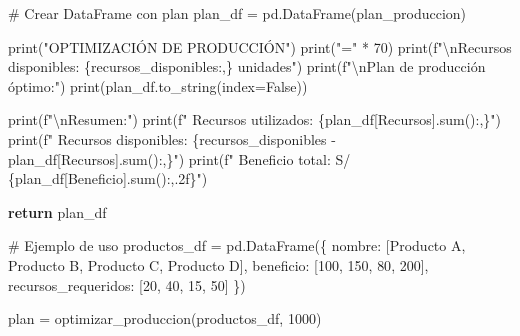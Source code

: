 \documentclass[
  doc,
  floatsintext,
  longtable,
  a4paper,
  nolmodern,
  notxfonts,
  notimes,
  12pt,
  colorlinks=true,linkcolor=blue,citecolor=blue,urlcolor=blue]{apa7}
\newenvironment{Shaded}{\begin{snugshade}}{\end{snugshade}}
\newcommand{\BuiltInTok}[1]{\textcolor[rgb]{0.00,0.23,0.31}{#1}}
\newcommand{\CharTok}[1]{\textcolor[rgb]{0.13,0.47,0.30}{#1}}
\newcommand{\CommentTok}[1]{\textcolor[rgb]{0.37,0.37,0.37}{#1}}
\newcommand{\ControlFlowTok}[1]{\textcolor[rgb]{0.00,0.23,0.31}{\textbf{#1}}}
\newcommand{\DecValTok}[1]{\textcolor[rgb]{0.68,0.00,0.00}{#1}}
\newcommand{\NormalTok}[1]{\textcolor[rgb]{0.00,0.23,0.31}{#1}}
\newcommand{\OperatorTok}[1]{\textcolor[rgb]{0.37,0.37,0.37}{#1}}
\newcommand{\SpecialCharTok}[1]{\textcolor[rgb]{0.37,0.37,0.37}{#1}}
\newcommand{\SpecialStringTok}[1]{\textcolor[rgb]{0.13,0.47,0.30}{#1}}
\newcommand{\StringTok}[1]{\textcolor[rgb]{0.13,0.47,0.30}{#1}}
\newcommand{\VariableTok}[1]{\textcolor[rgb]{0.07,0.07,0.07}{#1}}
\begin{document}
\begin{Shaded}
\begin{Highlighting}[]
    \CommentTok{\# Crear DataFrame con plan}
\NormalTok{    plan\_df }\OperatorTok{=}\NormalTok{ pd.DataFrame(plan\_produccion)}
    
    \BuiltInTok{print}\NormalTok{(}\StringTok{"OPTIMIZACIÓN DE PRODUCCIÓN"}\NormalTok{)}
    \BuiltInTok{print}\NormalTok{(}\StringTok{"="} \OperatorTok{*} \DecValTok{70}\NormalTok{)}
    \BuiltInTok{print}\NormalTok{(}\SpecialStringTok{f"}\CharTok{\textbackslash{}n}\SpecialStringTok{Recursos disponibles: }\SpecialCharTok{\{}\NormalTok{recursos\_disponibles}\SpecialCharTok{:,\}}\SpecialStringTok{ unidades"}\NormalTok{)}
    \BuiltInTok{print}\NormalTok{(}\SpecialStringTok{f"}\CharTok{\textbackslash{}n}\SpecialStringTok{Plan de producción óptimo:"}\NormalTok{)}
    \BuiltInTok{print}\NormalTok{(plan\_df.to\_string(index}\OperatorTok{=}\VariableTok{False}\NormalTok{))}
    
    \BuiltInTok{print}\NormalTok{(}\SpecialStringTok{f"}\CharTok{\textbackslash{}n}\SpecialStringTok{Resumen:"}\NormalTok{)}
    \BuiltInTok{print}\NormalTok{(}\SpecialStringTok{f"  Recursos utilizados: }\SpecialCharTok{\{}\NormalTok{plan\_df[}\StringTok{\textquotesingle{}Recursos\textquotesingle{}}\NormalTok{]}\SpecialCharTok{.}\BuiltInTok{sum}\NormalTok{()}\SpecialCharTok{:,\}}\SpecialStringTok{"}\NormalTok{)}
    \BuiltInTok{print}\NormalTok{(}\SpecialStringTok{f"  Recursos disponibles: }\SpecialCharTok{\{}\NormalTok{recursos\_disponibles }\OperatorTok{{-}}\NormalTok{ plan\_df[}\StringTok{\textquotesingle{}Recursos\textquotesingle{}}\NormalTok{]}\SpecialCharTok{.}\BuiltInTok{sum}\NormalTok{()}\SpecialCharTok{:,\}}\SpecialStringTok{"}\NormalTok{)}
    \BuiltInTok{print}\NormalTok{(}\SpecialStringTok{f"  Beneficio total: S/ }\SpecialCharTok{\{}\NormalTok{plan\_df[}\StringTok{\textquotesingle{}Beneficio\textquotesingle{}}\NormalTok{]}\SpecialCharTok{.}\BuiltInTok{sum}\NormalTok{()}\SpecialCharTok{:,.2f\}}\SpecialStringTok{"}\NormalTok{)}
    
    \ControlFlowTok{return}\NormalTok{ plan\_df}

\CommentTok{\# Ejemplo de uso}
\NormalTok{productos\_df }\OperatorTok{=}\NormalTok{ pd.DataFrame(\{}
    \StringTok{\textquotesingle{}nombre\textquotesingle{}}\NormalTok{: [}\StringTok{\textquotesingle{}Producto A\textquotesingle{}}\NormalTok{, }\StringTok{\textquotesingle{}Producto B\textquotesingle{}}\NormalTok{, }\StringTok{\textquotesingle{}Producto C\textquotesingle{}}\NormalTok{, }\StringTok{\textquotesingle{}Producto D\textquotesingle{}}\NormalTok{],}
    \StringTok{\textquotesingle{}beneficio\textquotesingle{}}\NormalTok{: [}\DecValTok{100}\NormalTok{, }\DecValTok{150}\NormalTok{, }\DecValTok{80}\NormalTok{, }\DecValTok{200}\NormalTok{],}
    \StringTok{\textquotesingle{}recursos\_requeridos\textquotesingle{}}\NormalTok{: [}\DecValTok{20}\NormalTok{, }\DecValTok{40}\NormalTok{, }\DecValTok{15}\NormalTok{, }\DecValTok{50}\NormalTok{]}
\NormalTok{\})}

\NormalTok{plan }\OperatorTok{=}\NormalTok{ optimizar\_produccion(productos\_df, }\DecValTok{1000}\NormalTok{)}
\end{Highlighting}
\end{Shaded}
\end{document}
